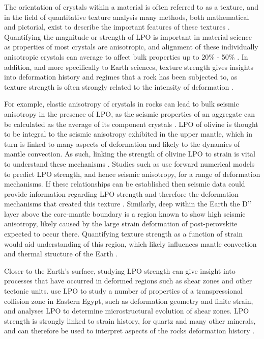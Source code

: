 \documentclass[a4paper,12pt,twoside]{report}
\numberwithin{equation}{chapter}
\begin{document}
The orientation of crystals within a material is often referred to as a texture, and in the field of quantitative texture analysis many methods, both mathematical and pictorial, exist to describe the important features of these textures \citep[for introductory texts see][]{bunge1982texture,Bunge1985,Randle2000,Mainprice}. Quantifying the magnitude or strength of LPO is important in material science as properties of most crystals are anisotropic, and alignment of these individually anisotropic crystals can average to affect bulk properties up to 20\% - 50\% \citep{Randle2000}. In addition, and more specifically to Earth sciences, texture strength gives insights into deformation history and regimes that a rock has been subjected to, as texture strength is often strongly related to the intensity of deformation \citep{Weiss1985}.

For example, elastic anisotropy of crystals in rocks can lead to bulk seismic anisotropy in the presence of LPO, as the seismic properties of an aggregate can be calculated as the average of its component crystals \citep{Tommasi1999}. LPO of olivine is thought to be integral to the seismic anisotropy exhibited in the upper mantle, which in turn is linked to many aspects of deformation and likely to the dynamics of mantle convection. As such, linking the strength of olivine LPO to strain is vital to understand these mechanisms \citep[e.g.][]{Warren2008}. Studies such as \cite{Tommasi2000} use forward numerical models to predict LPO strength, and hence seismic anisotropy, for a range of deformation mechanisms. If these relationships can be established then seismic data could provide information regarding LPO strength and therefore the deformation mechanisms that created this texture \citep[see][for details of a number of other approaches to this problem]{Blackman2002}. Similarly, deep within the Earth the D\rq\rq{} layer \citep{Garnero2008} above the core-mantle boundary is a region known to show high seismic anisotropy, likely caused by the large strain deformation of post-perovskite expected to occur there. Quantifying texture strength as a function of strain would aid understanding of this region, which likely influences mantle convection and thermal structure of the Earth \citep{Miyagi2010}. 

Closer to the Earth's surface, studying LPO strength can give insight into processes that have occurred in deformed regions such as shear zones and other tectonic units. \cite{Unzog2000} use LPO to study a number of properties of a transpressional collision zone in Eastern Egypt, such as deformation geometry and finite strain, and \cite{Lloyd2004} analyses LPO to determine microstructural evolution of shear zones. LPO strength is strongly linked to strain history, for quartz and many other minerals, and can therefore be used to interpret aspects of the rocks deformation history \cite{Price1985}.
\end{document}
